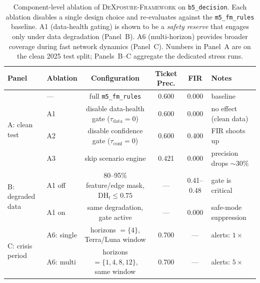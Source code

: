 \begin{table}[t]
\centering
\footnotesize
\setlength{\tabcolsep}{4pt}
\caption{Component-level ablation of \textsc{DeXposure-Framework} on
\texttt{b5\_decision}. Each ablation disables a single design choice and
re-evaluates against the \texttt{m5\_fm\_rules} baseline. A1 (data-health
gating) is shown to be a \emph{safety reserve} that engages only under
data degradation (Panel~B). A6 (multi-horizon) provides broader coverage
during fast network dynamics (Panel~C). Numbers in Panel~A are on the
clean 2025 test split; Panels~B--C aggregate the dedicated stress runs.}
\label{tab:ablation}
\begin{tabular}{l l c c c l}
\toprule
Panel & Ablation & Configuration & Ticket Prec. & FIR & Notes \\
\midrule
\multirow{4}{*}{A: clean test}
 & ---  & full \texttt{m5\_fm\_rules}                                       & 0.600 & 0.000 & baseline \\
 & A1   & disable data-health gate ($\tau_{\mathrm{data}}{=}0$)             & 0.600 & 0.000 & no effect (clean data) \\
 & A2   & disable confidence gate ($\tau_{\mathrm{conf}}{=}0$)              & 0.600 & 0.400 & FIR shoots up \\
 & A3   & skip scenario engine                                              & 0.421 & 0.000 & precision drops $\sim30\%$ \\
\midrule
\multirow{2}{*}{B: degraded data}
 & A1 off & 80--95\% feature/edge mask, $\mathrm{DH}_t{\le}0.75$            & ---   & 0.41--0.48 & gate is critical \\
 & A1 on  & same degradation, gate active                                   & ---   & 0.000      & safe-mode suppression \\
\midrule
\multirow{2}{*}{C: crisis period}
 & A6: single & horizons $=\{4\}$, Terra/Luna window                        & 0.700 & ---        & alerts: $1\times$ \\
 & A6: multi  & horizons $=\{1,4,8,12\}$, same window                       & 0.700 & ---        & alerts: $5\times$ \\
\bottomrule
\end{tabular}
\end{table}
